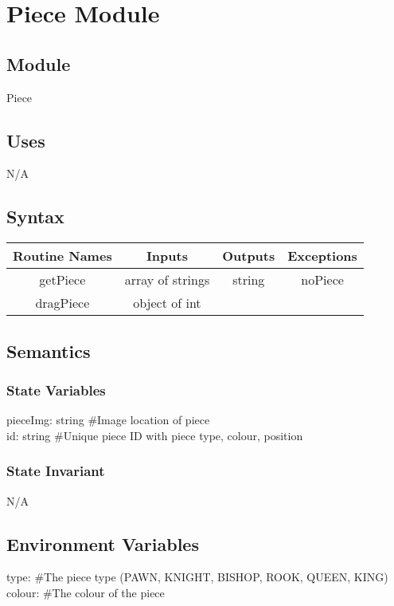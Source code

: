 \documentclass[12pt, titlepage]{article}
\begin{document}
\newpage
\section*{Piece Module}
    \subsection*{Module}
        Piece
    
    \subsection*{Uses}
        N/A
    
    \subsection*{Syntax}
        \begin{center}
            \begin{tabular}{|c|c|c|c|} 
                \hline
                Routine Names & Inputs & Outputs & Exceptions \\
                \hline
                getPiece & array of strings & string & noPiece \\ 
                \hline
                dragPiece & object of int &  & \\ 
                \hline
            \end{tabular}
        \end{center}
    
    \subsection*{Semantics}
        \subsubsection*{State Variables}
            pieceImg: string \#Image location of piece\\
            id: string \#Unique piece ID with piece type, colour, position

        \subsubsection*{State Invariant}
            N/A
            
    \subsection*{Environment Variables}
        type: \#The piece type (PAWN, KNIGHT, BISHOP, ROOK, QUEEN, KING) \\
        colour: \#The colour of the piece
\end{document}
